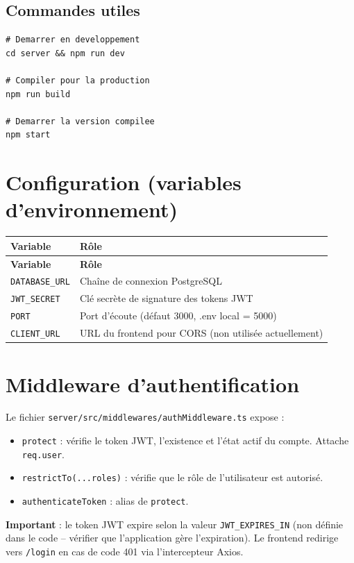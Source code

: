 \documentclass[12pt,a4paper]{report}
\begin{document}
\subsection{Commandes utiles}
\begin{lstlisting}
# Demarrer en developpement
cd server && npm run dev

# Compiler pour la production
npm run build

# Demarrer la version compilee
npm start
\end{lstlisting}

\section{Configuration (variables d'environnement)}

\begin{longtable}{|p{5cm}|p{9.5cm}|}
\hline
\textbf{Variable} & \textbf{Rôle} \\
\hline
\endfirsthead
\hline
\textbf{Variable} & \textbf{Rôle} \\
\hline
\endhead
\texttt{DATABASE\_URL} & Chaîne de connexion PostgreSQL \\
\hline
\texttt{JWT\_SECRET} & Clé secrète de signature des tokens JWT \\
\hline
\texttt{PORT} & Port d'écoute (défaut 3000, .env local = 5000) \\
\hline
\texttt{CLIENT\_URL} & URL du frontend pour CORS (non utilisée actuellement) \\
\hline
\end{longtable}

\section{Middleware d'authentification}

Le fichier \texttt{server/src/middlewares/authMiddleware.ts} expose :
\begin{itemize}
    \item \texttt{protect} : vérifie le token JWT, l'existence et l'état actif du compte. Attache \texttt{req.user}.
    \item \texttt{restrictTo(...roles)} : vérifie que le rôle de l'utilisateur est autorisé.
    \item \texttt{authenticateToken} : alias de \texttt{protect}.
\end{itemize}

\textbf{Important} : le token JWT expire selon la valeur \texttt{JWT\_EXPIRES\_IN} (non définie dans le code -- vérifier que l'application gère l'expiration). Le frontend redirige vers \texttt{/login} en cas de code 401 via l'intercepteur Axios.
\end{document}

